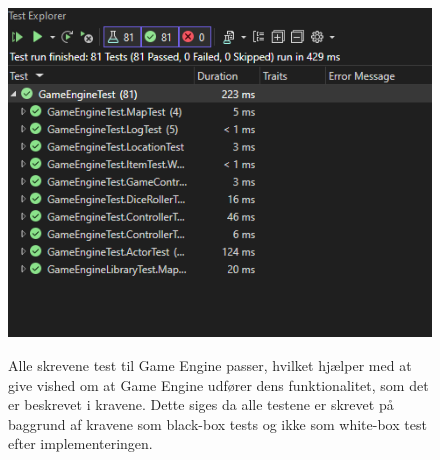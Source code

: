 \begin{figure}[h]
  \centering
  \caption{Alle skrevene test til Game Engine passer, hvilket hjælper med at give vished
          om at Game Engine udfører dens funktionalitet, som det er beskrevet i kravene.
          Dette siges da alle testene er skrevet på baggrund af kravene som black-box tests
          og ikke som white-box test efter implementeringen.}
  \includegraphics[scale=0.5]{02-body/Images/Test Results.png}
  \label{fig:TestResultsGameEngine}
\end{figure}



\newpage
